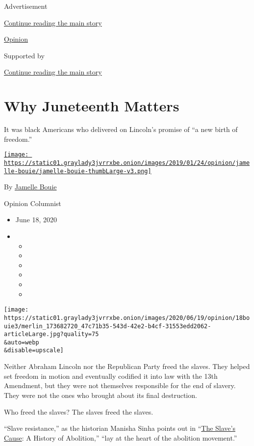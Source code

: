 Advertisement

\protect\hyperlink{after-top}{Continue reading the main story}

\href{/section/opinion}{Opinion}

Supported by

\protect\hyperlink{after-sponsor}{Continue reading the main story}

\hypertarget{why-juneteenth-matters}{%
\section{Why Juneteenth Matters}\label{why-juneteenth-matters}}

It was black Americans who delivered on Lincoln's promise of ``a new
birth of freedom.''

\href{https://www.nytimes3xbfgragh.onion/column/jamelle-bouie}{\texttt{[image: https://static01.graylady3jvrrxbe.onion/images/2019/01/24/opinion/jamelle-bouie/jamelle-bouie-thumbLarge-v3.png]}}

By
\href{https://www.nytimes3xbfgragh.onion/column/jamelle-bouie}{Jamelle
Bouie}

Opinion Columnist

\begin{itemize}
\item
  June 18, 2020
\item
  \begin{itemize}
  \item
  \item
  \item
  \item
  \item
  \item
  \end{itemize}
\end{itemize}

\texttt{[image: https://static01.graylady3jvrrxbe.onion/images/2020/06/19/opinion/18bouie3/merlin\_173682720\_47c71b35-543d-42e2-b4cf-31553edd2062-articleLarge.jpg?quality=75\\\&auto=webp\\\&disable=upscale]}

Neither Abraham Lincoln nor the Republican Party freed the slaves. They
helped set freedom in motion and eventually codified it into law with
the 13th Amendment, but they were not themselves responsible for the end
of slavery. They were not the ones who brought about its final
destruction.

Who freed the slaves? The slaves freed the slaves.

``Slave resistance,'' as the historian Manisha Sinha points out in
``\href{https://yalebooks.yale.edu/book/9780300227116/slaves-cause}{The
Slave's Cause}: A History of Abolition,'' ``lay at the heart of the
abolition movement.''

